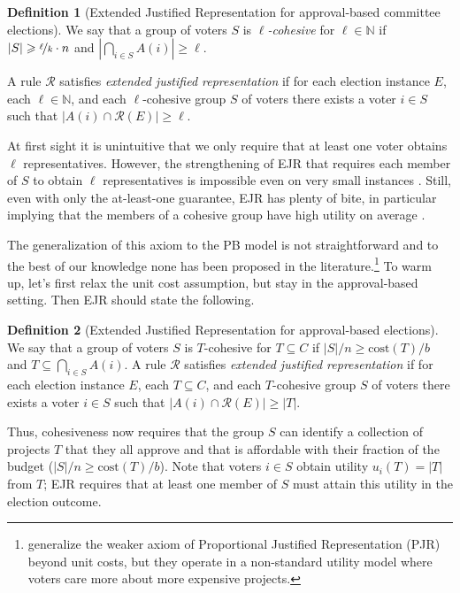 \documentclass[10pt]{scrartcl}
\renewcommand*{\geq}{\geqslant}
\newcommand{\naturals}{{{\mathbb{N}}}}
\newcommand{\cost}{{{\mathrm{cost}}}}
\newcommand{\calR}{{{\mathcal{R}}}}
\theoremstyle{definition}
\newtheorem{definition}{Definition}
\theoremstyle{plain}
\begin{document}
\begin{definition}[Extended Justified Representation for approval-based committee elections]\label{def:ejr_approval_unit}
We say that a group of voters $S$ is \emph{$\ell$-cohesive} for $\ell\in\naturals$ if $|S| \geq \nicefrac{\ell}{k}\cdot n$ and $|\bigcap_{i \in S}A(i)| \geq \ell$.

A rule $\calR$ satisfies \emph{extended justified representation} if for each election instance $E$, each $\ell\in\naturals$, and each $\ell$-cohesive group $S$ of voters there exists a voter $i \in S$ such that $|A(i) \cap \calR(E)| \geq \ell$.
\end{definition} 
At first sight it is unintuitive that we only require that at least one voter obtains $\ell$ representatives. However, the strengthening of EJR that requires each member of $S$ to obtain $\ell$ representatives is impossible even on very small instances \citep{justifiedRepresentation}. Still, even with only the at-least-one guarantee, EJR has plenty of bite, in particular implying that the members of a cohesive group have high utility on average \citep{AEHLSS18,skowron:prop-degree,pet-sko:laminar}.

The generalization of this axiom to the PB model is not straightforward and to the best of our knowledge none has been proposed in the literature.\footnote{\citet{aziz2018proportionally} generalize the weaker axiom of Proportional Justified Representation (PJR) \citep{pjr17} beyond unit costs, but they operate in a non-standard utility model where voters care more about more expensive projects.}
To warm up, let's first relax the unit cost assumption, but stay in the approval-based setting. Then EJR should state the following.
\begin{definition}[Extended Justified Representation for approval-based elections]\label{def:ejr_approval}
	We say that a group of voters $S$ is $T$-cohesive for $T \subseteq C$ if $|S|/n \geq \cost(T)/b$ and $T \subseteq \bigcap_{i\in S} A(i)$.
A rule $\calR$ satisfies \emph{extended justified representation} if for each election instance $E$, each $T \subseteq C$, and each $T$-cohesive group $S$ of voters there exists a voter $i \in S$ such that $|A(i) \cap \calR(E)| \geq |T|$.
\end{definition}

Thus, cohesiveness now requires that the group $S$ can identify a collection of projects $T$ that they all approve and that is affordable with their fraction of the budget ($|S|/n \geq \cost(T)/b$). Note that voters $i \in S$ obtain utility $u_i(T) = |T|$ from $T$; EJR requires that at least one member of $S$ must attain this utility in the election outcome.
\end{document}
